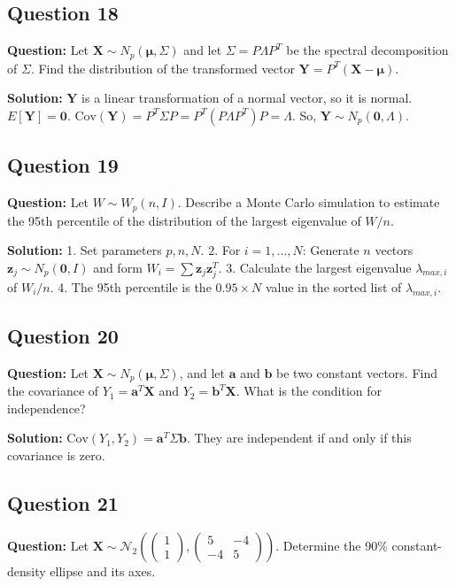 \subsection*{Question 18}
\textbf{Question:} Let $\mathbf{X} \sim N_p(\boldsymbol{\mu}, \Sigma)$ and let $\Sigma = P \Lambda P^T$ be the spectral decomposition of $\Sigma$. Find the distribution of the transformed vector $\mathbf{Y} = P^T(\mathbf{X} - \boldsymbol{\mu})$.

\textbf{Solution:}
$\mathbf{Y}$ is a linear transformation of a normal vector, so it is normal.
$E[\mathbf{Y}] = \mathbf{0}$.
$\text{Cov}(\mathbf{Y}) = P^T \Sigma P = P^T (P \Lambda P^T) P = \Lambda$.
So, $\mathbf{Y} \sim N_p(\mathbf{0}, \Lambda)$.

\subsection*{Question 19}
\textbf{Question:} Let $W \sim W_p(n, I)$. Describe a Monte Carlo simulation to estimate the 95th percentile of the distribution of the largest eigenvalue of $W/n$.

\textbf{Solution:}
1.  Set parameters $p, n, N$.
2.  For $i=1, \dots, N$: Generate $n$ vectors $\mathbf{z}_j \sim N_p(\mathbf{0}, I)$ and form $W_i = \sum \mathbf{z}_j \mathbf{z}_j^T$.
3.  Calculate the largest eigenvalue $\lambda_{max, i}$ of $W_i/n$.
4.  The 95th percentile is the $0.95 \times N$ value in the sorted list of $\lambda_{max, i}$.

\subsection*{Question 20}
\textbf{Question:} Let $\mathbf{X} \sim N_p(\boldsymbol{\mu}, \Sigma)$, and let $\mathbf{a}$ and $\mathbf{b}$ be two constant vectors. Find the covariance of $Y_1 = \mathbf{a}^T\mathbf{X}$ and $Y_2 = \mathbf{b}^T\mathbf{X}$. What is the condition for independence?

\textbf{Solution:}
$\text{Cov}(Y_1, Y_2) = \mathbf{a}^T \Sigma \mathbf{b}$. They are independent if and only if this covariance is zero.

\subsection*{Question 21}
\textbf{Question:} Let $\mathbf{X} \sim \mathcal{N}_2 \left( \begin{pmatrix} 1 \\ 1 \end{pmatrix}, \begin{pmatrix} 5 & -4 \\ -4 & 5 \end{pmatrix} \right)$. Determine the 90\% constant-density ellipse and its axes.

